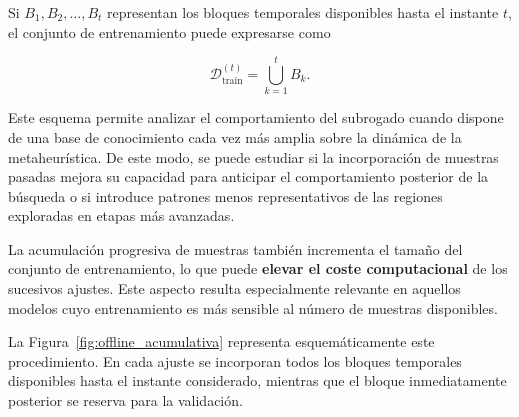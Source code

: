 Si \(B_1, B_2, \dots, B_t\) representan los bloques temporales disponibles hasta el instante \(t\), el conjunto de entrenamiento puede expresarse como

\begin{equation}
    \mathcal{D}_{\text{train}}^{(t)}
    =
    \bigcup_{k=1}^{t} B_k.
\end{equation}

Este esquema permite analizar el comportamiento del subrogado cuando dispone de una base de conocimiento cada vez más amplia sobre la dinámica de la metaheurística. De este modo, se puede estudiar si la incorporación de muestras pasadas mejora su capacidad para anticipar el comportamiento posterior de la búsqueda o si introduce patrones menos representativos de las regiones exploradas en etapas más avanzadas.

La acumulación progresiva de muestras también incrementa el tamaño del conjunto de entrenamiento, lo que puede \textbf{elevar el coste computacional} de los sucesivos ajustes. Este aspecto resulta especialmente relevante en aquellos modelos cuyo entrenamiento es más sensible al número de muestras disponibles.

La Figura~\ref{fig:offline_acumulativa} representa esquemáticamente este procedimiento. En cada ajuste se incorporan todos los bloques temporales disponibles hasta el instante considerado, mientras que el bloque inmediatamente posterior se reserva para la validación.





